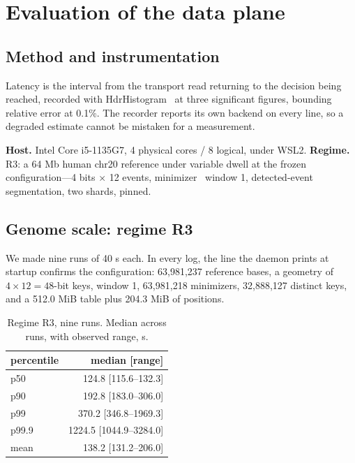 \documentclass[runningheads]{llncs}
\begin{document}
\section{Evaluation of the data plane}
\label{sec:eval}

\subsection{Method and instrumentation}

Latency is the interval from the transport read returning to the decision being reached,
recorded with HdrHistogram~\cite{hdrhistogram} at three significant figures, bounding relative
error at 0.1\%. The recorder reports its own backend on every line, so a degraded estimate
cannot be mistaken for a measurement.

\textbf{Host.} Intel Core i5-1135G7, 4 physical cores / 8 logical, under WSL2.
\textbf{Regime.} R3: a 64 Mb human chr20 reference
under variable dwell at the frozen configuration---4 bits $\times$ 12 events,
minimizer~\cite{minimizers} window
1, detected-event segmentation, two shards, pinned.

\subsection{Genome scale: regime R3}

We made nine runs of 40 s each. In every log, the line the daemon prints at startup confirms the
configuration: 63,981,237 reference bases, a geometry of $4 \times 12 = 48$-bit keys, window 1,
63,981,218 minimizers, 32,888,127 distinct keys, and a 512.0 MiB table plus 204.3 MiB of
positions.

\begin{table}[t]
\caption{Regime R3, nine runs. Median across runs, with observed range, \textmu{}s.}
\label{tab:r3}
\centering
\footnotesize
\begin{tabular}{lr}
\toprule
percentile & median [range] \\
\midrule
p50   & 124.8 [115.6--132.3] \\
p90   & 192.8 [183.0--306.0] \\
p99   & 370.2 [346.8--1969.3] \\
p99.9 & 1224.5 [1044.9--3284.0] \\
mean  & 138.2 [131.2--206.0] \\
\bottomrule
\end{tabular}
\end{table}
\end{document}
